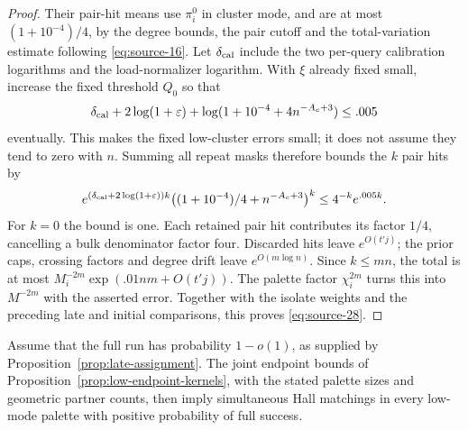 \begin{proof}
Their pair-hit means use \(\pi_i^0\) in cluster mode, and are at
most \((1+10^{-4})/4\), by the degree bounds, the pair cutoff and
the total-variation estimate following \eqref{eq:source-16}.
Let \(\delta_{\rm cal}\) include the two per-query calibration
logarithms and the load-normalizer logarithm. With \(\xi\) already
fixed small, increase the fixed threshold \(Q_0\) so that
\[
 \delta_{\rm cal}+2\log(1+\varepsilon)
       +\log(1+10^{-4}+4n^{-A_c+3})\le .005
\]
eventually. This makes the fixed low-cluster errors small; it does
not assume they tend to zero with \(n\). Summing all repeat masks
therefore bounds the \(k\) pair hits by
\[
 e^{(\delta_{\rm cal}+2\log(1+\varepsilon))k}
       \big((1+10^{-4})/4+n^{-A_c+3}\big)^k
 \le4^{-k}e^{.005k}.
\]
For \(k=0\) the bound is one. Each retained pair hit contributes
its factor \(1/4\), cancelling a bulk denominator factor four.
Discarded hits leave \(e^{O(t'j)}\); the prior caps, crossing
factors and degree drift leave \(e^{O(m\log n)}\). Since
\(k\le mn\), the total is at most
\(M_i^{-2m}\exp(.01nm+O(t'j))\). The palette factor
\(\chi_i^{2m}\) turns this into \(M^{-2m}\) with the asserted
error. Together with the isolate weights and the preceding late and
initial comparisons, this proves \eqref{eq:source-28}.
\end{proof}

\begin{lemma}\label{lem:low-two-endpoint-hall}
Assume that the full run has probability \(1-o(1)\), as supplied by
Proposition~\ref{prop:late-assignment}. The joint endpoint bounds of
Proposition~\ref{prop:low-endpoint-kernels}, with the stated palette sizes
and geometric partner counts, then imply simultaneous Hall matchings in
every low-mode palette with positive probability of full success.
\end{lemma}

